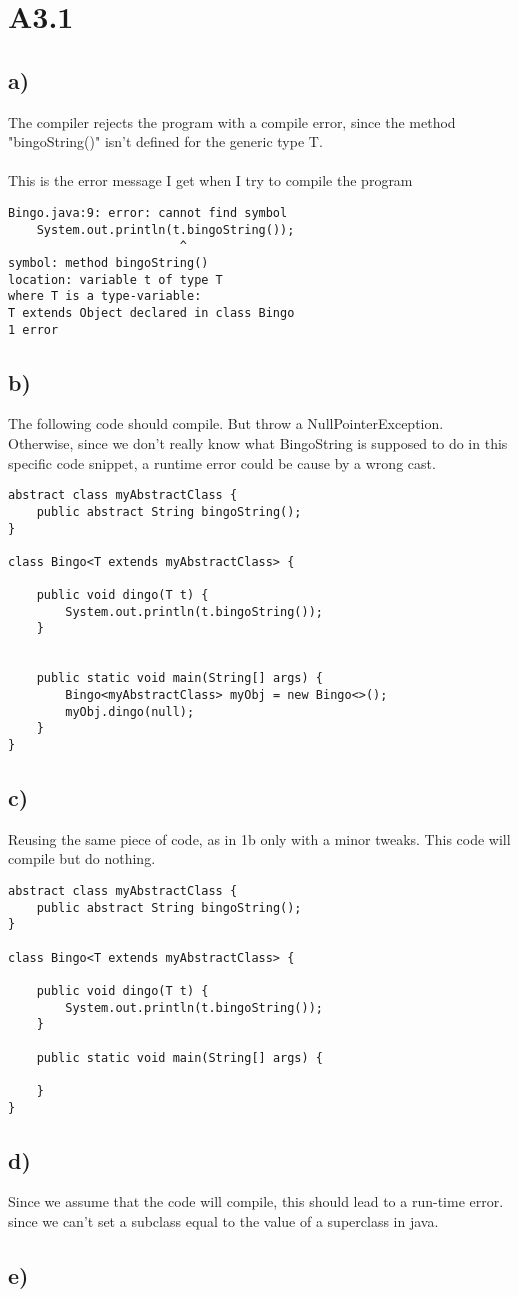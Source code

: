 \section{A3.1}

\subsection{a)}
The compiler rejects the program with a compile error, since the method
"bingoString()" isn't defined for the generic type T.
\\
\\
This is the error message I get when I try to compile the program
\begin{verbatim}
Bingo.java:9: error: cannot find symbol
    System.out.println(t.bingoString());
                        ^
symbol: method bingoString()
location: variable t of type T
where T is a type-variable:
T extends Object declared in class Bingo
1 error
\end{verbatim}

\subsection{b)}
The following code should compile. But throw a NullPointerException. Otherwise, since we don't
really know what BingoString is supposed to do in this specific code snippet, a runtime error could
be cause by a wrong cast.

\begin{verbatim}
abstract class myAbstractClass {
    public abstract String bingoString();
}

class Bingo<T extends myAbstractClass> {

    public void dingo(T t) {
        System.out.println(t.bingoString());
    }


    public static void main(String[] args) {
        Bingo<myAbstractClass> myObj = new Bingo<>();
        myObj.dingo(null);
    }
}
\end{verbatim}

\subsection{c)}
Reusing the same piece of code, as in 1b only with a minor tweaks. This code will compile but do nothing.
\begin{verbatim}
abstract class myAbstractClass {
    public abstract String bingoString();
}

class Bingo<T extends myAbstractClass> {

    public void dingo(T t) {
        System.out.println(t.bingoString());
    }

    public static void main(String[] args) {
        
    }
}
\end{verbatim}

\subsection{d)}
Since we assume that the code will compile, this should lead to a run-time error.
since we can't set a subclass equal to the value of a superclass in java.

\subsection{e)}


